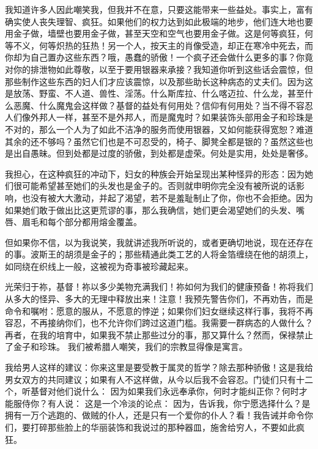 我知道许多人因此嘲笑我，但我并不在意，只要这能带来一些益处。事实上，富有确实使人丧失理智、疯狂。如果他们的权力达到如此极端的地步，他们连大地也要用金子做，墙壁也要用金子做，甚至天空和空气也要用金子做。这是何等疯狂，何等不义，何等炽热的狂热！另一个人，按天主的肖像受造，却正在寒冷中死去，而你却为自己置办这些东西？哦，愚蠢的骄傲！一个疯子还会做什么更多的事？你竟对你的排泄物如此尊敬，以至于要用银器来承接？我知道你听到这些话会震惊，但那些制作这些东西的妇人们才应该震惊，以及那些助长这种病态的丈夫们。因为这是放荡、野蛮、不人道、兽性、淫荡。什么斯库拉、什么喀迈拉、什么龙，甚至什么恶魔、什么魔鬼会这样做？基督的益处有何用处？信仰有何用处？当不得不容忍人们像外邦人一样，甚至不是外邦人，而是魔鬼时？如果装饰头部用金子和珍珠是不对的，那么一个人为了如此不洁净的服务而使用银器，又如何能获得宽恕？难道其余的还不够吗？虽然它们也是不可忍受的，椅子、脚凳全都是银的？虽然这些也是出自愚昧。但到处都是过度的骄傲，到处都是虚荣。何处是实用，处处是奢侈。\par

我担心，在这种疯狂的冲动下，妇女的种族会开始呈现出某种怪异的形态：因为她们很可能希望甚至她们的头发也是金子的。否则就申明你完全没有被所说的话影响，也没有被大大激动，并起了渴望，若不是羞耻制止了你，你也不会拒绝。因为如果她们敢于做出比这更荒谬的事，那么我确信，她们更会渴望她们的头发、嘴唇、眉毛和每个部分都用熔金覆盖。\par

但如果你不信，以为我说笑，我就讲述我所听说的，或者更确切地说，现在还存在的事。波斯王的胡须是金子的；那些精通此类工艺的人将金箔缠绕在他的胡须上，如同绕在织线上一般，这被视为奇事被珍藏起来。\par

光荣归于祢，基督！祢以多少美物充满我们！祢如何为我们的健康预备！祢将我们从多大的怪异、多大的无理中释放出来！注意！我预先警告你们，不再劝告，而是命令和嘱咐：愿意的服从，不愿意的悖逆；如果你们妇女继续这样行事，我将不再容忍，不再接纳你们，也不允许你们跨过这道门槛。我需要一群病态的人做什么？再者，在我的培育中，如果我不禁止那些过分的事，那又算什么？然而，保禄禁止了金子和珍珠。 我们被希腊人嘲笑，我们的宗教显得像是寓言。\par

我给男人这样的建议：你来这里是要受教于属灵的哲学？除去那种骄傲！这是我给男女双方的共同建议；如果有人不这样做，从今以后我不会容忍。门徒们只有十二个，听基督对他们说什么： 因为如果我们永远奉承你，何时才能纠正你？何时才能服侍你？有人说： 这是一个冷淡的论点： 因为，告诉我，你宁愿选择什么？是拥有一万个逃跑的、做贼的仆人，还是只有一个爱你的仆人？看！我告诫并命令你们，要打碎那些脸上的华丽装饰和我说过的那种器皿，施舍给穷人，不要如此疯狂。\par

